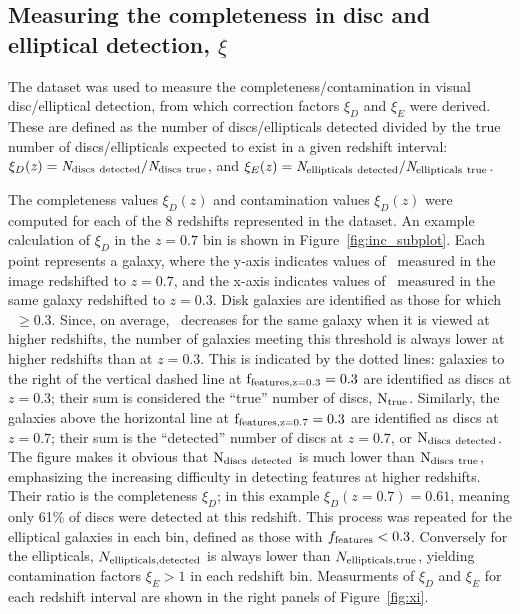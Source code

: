 \documentclass[useAMS,usenatbib]{mn2e}
\begin{document}
\subsection{Measuring the completeness in disc and elliptical detection, $\xi$}
\label{ssec:xi}

The  dataset was used to measure the completeness/contamination in visual disc/elliptical detection, from which correction factors $\xi_D$ and $\xi_E$ were derived. These are defined as the number of discs/ellipticals detected divided by the true number of discs/ellipticals expected to exist in a given redshift interval: $ \xi_D(\it{z})=N_{\rm discs~detected}/N_{\rm discs~true}$, and $\xi_E(\it{z})=N_{\rm ellipticals~detected}/N_{\rm ellipticals~true}$. 

The completeness values $\xi_D(z)$ and contamination values $\xi_D(z)$ were computed for each of the 8 redshifts represented in the  dataset. An example calculation of $\xi_D$ in the $z=0.7$ bin is shown in Figure~\ref{fig:inc_subplot}. Each point represents a  galaxy, where the y-axis indicates values of \ffeatures~measured in the image redshifted to $z=0.7$, and the x-axis indicates values of \ffeatures~measured in the same galaxy redshifted to $z=0.3$. Disk galaxies are identified as those for which \ffeatures~$\ge0.3$. Since, on average, \ffeatures~decreases for the same galaxy when it is viewed at higher redshifts, the number of galaxies meeting this threshold is always lower at higher redshifts than at $z=0.3$. This is indicated by the dotted lines: galaxies to the right of the vertical dashed line at $\rm f_{features,z=0.3}=0.3$ are identified as discs at $z=0.3$; their sum is considered the ``true'' number of discs, $\rm N_{true}$. Similarly, the galaxies above the horizontal line at $\rm f_{features,z=0.7}=0.3$ are identified as discs at $z=0.7$; their sum is the ``detected'' number of discs at $z=0.7$, or $\rm N_{discs~detected}$. The figure makes it obvious that $\rm N_{discs~detected}$ is much lower than $\rm N_{discs~true}$, emphasizing the increasing difficulty in detecting features at higher redshifts. Their ratio is the completeness $\xi_D$; in this example $\xi_D(z=0.7)=0.61$, meaning only 61\% of discs were detected at this redshift. This process was repeated for the elliptical galaxies in each bin, defined as those with $f_{\rm features}<0.3$. Conversely for the ellipticals, $N_{\rm ellipticals, detected}$ is always lower than $N_{\rm ellipticals, true}$, yielding contamination factors $\xi_E>1$ in each redshift bin. Measurments of $\xi_D$ and $\xi_E$ for each redshift interval are shown in the right panels of Figure~\ref{fig:xi}.
\end{document}
